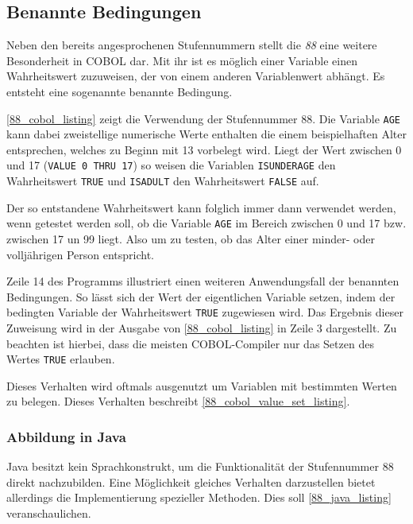 \subsection{Benannte Bedingungen}
Neben den bereits angesprochenen Stufennummern stellt die \textit{88} eine weitere Besonderheit in COBOL dar. Mit ihr ist es möglich einer Variable einen Wahrheitswert zuzuweisen, der von einem anderen Variablenwert abhängt. Es entsteht eine sogenannte benannte Bedingung.

\autoref{88_cobol_listing} zeigt die Verwendung der Stufennummer 88. Die Variable \texttt{AGE} kann dabei zweistellige numerische Werte enthalten die einem beispielhaften Alter entsprechen, welches zu Beginn mit 13 vorbelegt wird. Liegt der Wert zwischen 0 und 17 (\texttt{VALUE 0 THRU 17}) so weisen die Variablen \texttt{ISUNDERAGE} den Wahrheitswert \texttt{TRUE} und \texttt{ISADULT} den Wahrheitswert \texttt{FALSE} auf.

Der so entstandene Wahrheitswert kann folglich immer dann verwendet werden, wenn getestet werden soll, ob die Variable \texttt{AGE} im Bereich zwischen 0 und 17 bzw. zwischen 17 un 99 liegt. Also um zu testen, ob das Alter einer minder- oder volljährigen Person entspricht.

\sepCodeAndOutputCheck
{}
Zeile 14 des Programms illustriert einen weiteren Anwendungsfall der benannten Bedingungen. So lässt sich der Wert der eigentlichen Variable setzen, indem der bedingten Variable der Wahrheitswert \texttt{TRUE} zugewiesen wird. Das Ergebnis dieser Zuweisung wird in der Ausgabe von \autoref{88_cobol_listing} in Zeile 3 dargestellt. Zu beachten ist hierbei, dass die meisten COBOL-Compiler nur das Setzen des Wertes \texttt{TRUE} erlauben.

Dieses Verhalten wird oftmals ausgenutzt um Variablen mit bestimmten Werten zu belegen. Dieses Verhalten beschreibt \autoref{88_cobol_value_set_listing}.

\subsubsection*{Abbildung in Java}
Java besitzt kein Sprachkonstrukt, um die Funktionalität der Stufennummer 88 direkt nachzubilden. Eine Möglichkeit gleiches Verhalten darzustellen bietet allerdings die Implementierung spezieller Methoden. Dies soll \autoref{88_java_listing} veranschaulichen.

